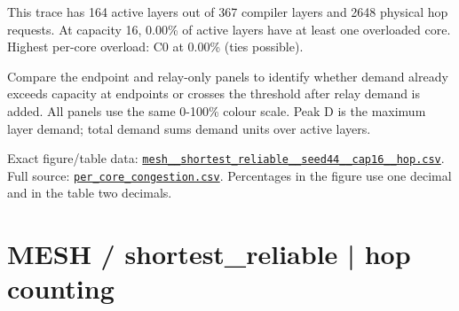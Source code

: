 \documentclass[10pt,a4paper]{article}
\begin{document}
This trace has 164 active layers out of 367 compiler layers and 2648 physical hop requests. At capacity 16, 0.00\% of active layers have at least one overloaded core. Highest per-core overload: C0 at 0.00\% (ties possible).\par
Compare the endpoint and relay-only panels to identify whether demand already exceeds capacity at endpoints or crosses the threshold after relay demand is added. All panels use the same 0-100\% colour scale. Peak D is the maximum layer demand; total demand sums demand units over active layers.\par
Exact figure/table data: \href{\detokenize{file:///home/dhruv-pansuriya/Documents/BTP/Compiler-Driven-ACE/output/pdf/qaoa_methods_congestion/tables/mesh__shortest_reliable__seed44__cap16__hop.csv}}{\nolinkurl{mesh__shortest_reliable__seed44__cap16__hop.csv}}. Full source: \href{\detokenize{file:///home/dhruv-pansuriya/Documents/BTP/Compiler-Driven-ACE/results/qaoa_2seed_2026-10-26/congestion/per_core_congestion.csv}}{\nolinkurl{per_core_congestion.csv}}. Percentages in the figure use one decimal and in the table two decimals.\par
\clearpage
\section*{MESH / shortest\_reliable | hop counting}
\end{document}
